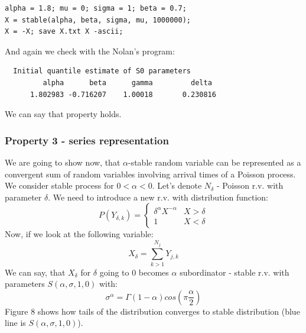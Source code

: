 \documentclass{article}
\begin{document}
\begin{lstlisting}
alpha = 1.8; mu = 0; sigma = 1; beta = 0.7;
X = stable(alpha, beta, sigma, mu, 1000000);
X = -X; save X.txt X -ascii;
\end{lstlisting} 
And again we check with the Nolan's program:
\begin{lstlisting}
  Initial quantile estimate of S0 parameters
         alpha      beta      gamma         delta
      1.802983 -0.716207    1.00018       0.230816 
\end{lstlisting}
We can say that property holds.

\subsubsection{Property 3 - series representation}
We are going to show now, that $\alpha$-stable random variable can be represented as a convergent sum of random variables involving arrival times of a Poisson process.\\
We consider stable process for $0 < \alpha < 0$. Let's denote $N_\delta$ - Poisson r.v. with parameter $\delta$. We need to introduce a new r.v. with distribution function:
	\begin{equation*}
		P(Y_{\delta, k}) = \begin{cases}
		\delta^\alpha X^{-\alpha} & X > \delta \\
		1 & X < \delta
		\end{cases}
	\end{equation*}
Now, if we look at the following variable:
\begin{equation*}
X_\delta = \sum_{k>1}^{N_j} Y_{j,k}
\end{equation*}
We can say, that $X_\delta$ for $\delta$ going to 0 becomes $\alpha$ subordinator - stable r.v. with parameters $S(\alpha, \sigma, 1, 0)$ with:
\begin{equation*}
\sigma^\alpha = \Gamma(1 - \alpha)cos(\pi \frac{\alpha}{2})
\end{equation*}
Figure 8 shows how tails of the distribution converges to stable distribution (blue line is $S(\alpha, \sigma, 1, 0)$).
\end{document}
